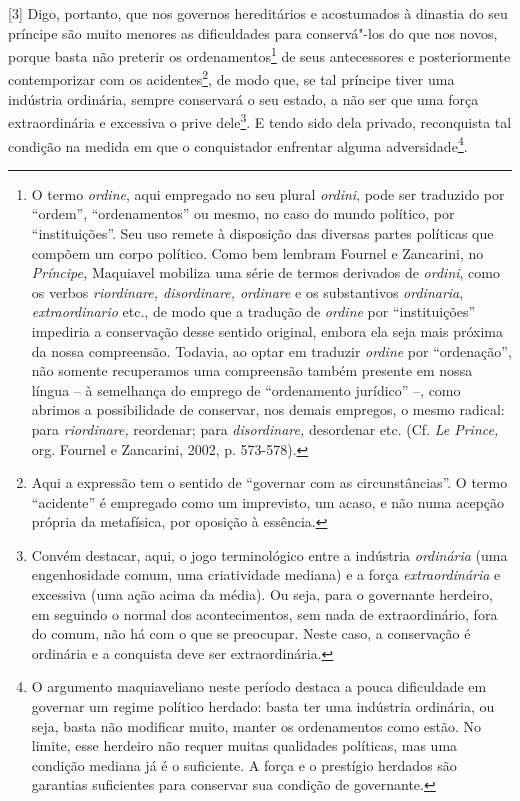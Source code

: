 {[}3{]} Digo, portanto, que nos governos hereditários e acostumados à
dinastia do seu príncipe são muito menores as dificuldades para
conservá"-los do que nos novos, porque basta não preterir os
ordenamentos\footnote{O termo \emph{ordine}, aqui empregado no seu
  plural \emph{ordini}, pode ser traduzido por ``ordem'',
  ``ordenamentos'' ou mesmo, no caso do mundo político, por
  ``instituições''. Seu uso remete à disposição das diversas partes
  políticas que compõem um corpo político. Como bem lembram Fournel e
  Zancarini, no \emph{Príncipe,} Maquiavel mobiliza uma série de termos
  derivados de \emph{ordini}, como os verbos \emph{riordinare,
  disordinare, ordinare} e os substantivos \emph{ordinaria},
  \emph{extraordinario} etc., de modo que a tradução de \emph{ordine}
  por ``instituições'' impediria a conservação desse sentido original,
  embora ela seja mais próxima da nossa compreensão. Todavia, ao optar
  em traduzir \emph{ordine} por ``ordenação'', não somente recuperamos
  uma compreensão também presente em nossa língua -- à semelhança do
  emprego de ``ordenamento jurídico'' --, como abrimos a possibilidade
  de conservar, nos demais empregos, o mesmo radical: para
  \emph{riordinare,} reordenar; para \emph{disordinare,} desordenar etc.
  (Cf. \emph{Le Prince,} org. Fournel e Zancarini, 2002, p. 573-578).}
de seus antecessores e posteriormente contemporizar com os
acidentes\footnote{Aqui a expressão tem o sentido de ``governar com as
  circunstâncias''. O termo ``acidente'' é empregado como um imprevisto,
  um acaso, e não numa acepção própria da metafísica, por oposição à
  essência.}, de modo que, se tal príncipe tiver uma indústria
ordinária, sempre conservará o seu estado, a não ser que uma força
extraordinária e excessiva o prive dele\footnote{Convém destacar, aqui,
  o jogo terminológico entre a indústria \emph{ordinária} (uma
  engenhosidade comum, uma criatividade mediana) e a força
  \emph{extraordinária} e excessiva (uma ação acima da média). Ou seja,
  para o governante herdeiro, em seguindo o normal dos acontecimentos,
  sem nada de extraordinário, fora do comum, não há com o que se
  preocupar. Neste caso, a conservação é ordinária e a conquista deve
  ser extraordinária.}. E tendo sido dela privado, reconquista tal
condição na medida em que o conquistador enfrentar alguma
adversidade\footnote{O argumento maquiaveliano neste período destaca a
  pouca dificuldade em governar um regime político herdado: basta ter
  uma indústria ordinária, ou seja, basta não modificar muito, manter os
  ordenamentos como estão. No limite, esse herdeiro não requer muitas
  qualidades políticas, mas uma condição mediana já é o suficiente. A
  força e o prestígio herdados são garantias suficientes para conservar
  sua condição de governante.}.

